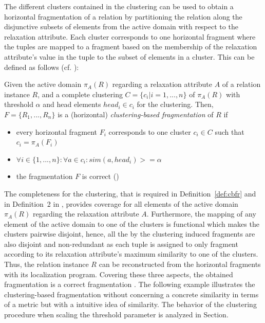 The different clusters contained in the clustering can be used to obtain a horizontal fragmentation of a relation by partitioning the relation along the 
disjunctive subsets of elements from the active domain with respect to the relaxation attribute. Each cluster corresponds to one horizontal fragment where
the tuples are mapped to a fragment based on the membership of the relaxation attribute's value in the tuple to the subset of elements in a cluster. This 
can be defined as follows (cf. \cite[Definition~2]{Wiese2014}):

\begin{definition} \label{def:cbfr}
Given the active domain $\pi_A(R)$ regarding a relaxation attribute $A$ of a relation instance $R$, and a complete clustering $C=\{c_i|i=1,...,n\}$
of $\pi_A(R)$ with threshold $\alpha$ and head elements $head_i \in c_i$ for the clustering. Then, $F=\{R_1,...,R_n\}$ is a (horizontal) 
\emph{clustering-based fragmentation} of $R$ if
\begin{itemize}
    \item every horizontal fragment $F_i$ corresponds to one cluster $c_i \in C$ such that $c_i=\pi_A(F_i)$
    \item $\forall i \in \{1,...,n\}: \forall a \in c_i: sim(a, head_i)>=\alpha$
    \item the fragmentation $F$ is correct (\cite[p.~103]{Ozsu1991})
\end{itemize}
\end{definition}

The completeness for the clustering, that is required in Definition~\ref{def:cbfr} and in Definition~2 in \cite{Wiese2014},
provides coverage for all elements of the active domain $\pi_A(R)$ regarding the relaxation attribute $A$. Furthermore, the mapping of any element of the
active domain to one of the clusters is functional which makes the clusters pairwise disjoint, hence, all the by the clustering induced fragments are also
disjoint and non-redundant as each tuple is assigned to only fragment according to its relaxation attribute's maximum similarity to one of the clusters.
Thus, the relation instance $R$ can be reconstructed from the horizontal fragments with its localization program. Covering these three aspects, the
obtained fragmentation is a correct fragmentation \cite[p.~103]{Ozsu1991}. The following example illustrates the clustering-based fragmentation without
concerning a concrete similarity in terms of a metric but with a intuitive idea of similarity. The behavior of the clustering procedure when scaling the
threshold parameter is analyzed in Section. 

